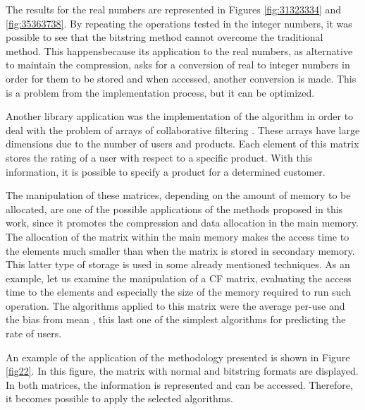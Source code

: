 \documentclass[10pt]{article}
\begin{document}
The results for the real numbers are represented in Figures \ref{fig:31323334} and \ref{fig:35363738}. 
By repeating the operations tested in the integer numbers, it was possible to see that the bitstring method 
cannot overcome the traditional method. This happensbecause its application to  the real numbers, as alternative 
to maintain the compression, asks for a conversion of real to integer numbers in order for them to be stored and 
when accessed, another conversion is made. This is a problem from the implementation process, but it can be optimized.

Another library application was the implementation of the algorithm in order to deal with the problem of arrays of 
collaborative filtering \cite{cf}. These arrays have large dimensions due to the number of users and products. Each 
element of this matrix stores the rating of a user with respect to a specific product. With this information, it is 
possible to specify a product for a determined customer.

The manipulation of these matrices, depending on the amount of memory to be allocated, are one of the possible 
applications of the methods proposed in this work, since it promotes the compression and data allocation in the main 
memory. The allocation of the matrix within the main memory makes the access time to the elements much smaller than when 
the matrix is stored in secondary memory. This latter type of storage is used in some already mentioned techniques. As 
an example, let us examine the manipulation of a CF matrix, evaluating the access time to the elements and especially 
the size of the memory required to run such operation. The algorithms applied to this matrix were the average per-use 
and the bias from mean \cite{cf}, this last one of the simplest algorithms for predicting the rate of users.

An example of the application of the methodology presented is shown in Figure \ref{fig22}. In this figure, the matrix 
with normal and bitstring formats are displayed. In both matrices, the information is represented and can be accessed. 
Therefore, it becomes possible to apply the selected algorithms.
\end{document}
